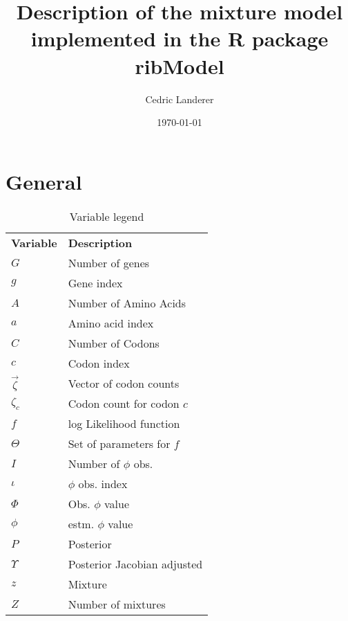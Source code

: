 \documentclass[11pt]{article}
\begin{document}
  \title{Description of the mixture model implemented in the R package ribModel}
  \author{Cedric Landerer} %
  \date{\today}
  \maketitle
  \doublespacing

  
  \section{General}
  \begin{table}[h]
    \centering
    \caption{Variable legend}
    \label{var_desc}
    \begin{tabular}{|l|l|}
      \cline{1-2}
      \textbf{Variable} & \textbf{Description}		\\ \cline{1-2}
      $G$		& Number of genes		\\ \cline{1-2}
      $g$		& Gene index			\\ \cline{1-2}
      $A$		& Number of Amino Acids		\\ \cline{1-2}
      $a$		& Amino acid index		\\ \cline{1-2}
      $C$		& Number of Codons		\\ \cline{1-2}
      $c$		& Codon index			\\ \cline{1-2}
      $\vec{\zeta}$	& Vector of codon counts	\\ \cline{1-2}
      $\zeta_c$		& Codon count for codon $c$	\\ \cline{1-2}
      $f$		& log Likelihood function	\\ \cline{1-2}
      $\Theta$		& Set of parameters for $f$	\\ \cline{1-2}
      $I$		& Number of $\phi$ obs.		\\ \cline{1-2}
      $\iota$		& $\phi$ obs. index		\\ \cline{1-2}
      $\Phi$		& Obs. $\phi$ value		\\ \cline{1-2}
      $\phi$		& estm. $\phi$ value		\\ \cline{1-2}
      $P$		& Posterior			\\ \cline{1-2}
      $\Upsilon$	& Posterior Jacobian adjusted	\\ \cline{1-2}
      $z$		& Mixture			\\ \cline{1-2}
      $Z$		& Number of mixtures		\\ \cline{1-2}
    \end{tabular}
  \end{table}
  
\end{document}
